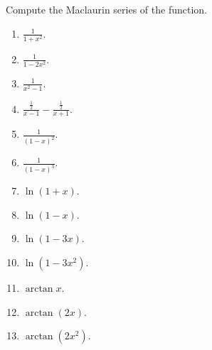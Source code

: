 Compute the Maclaurin series of the function.
\begin{multicols}{2}
\begin{enumerate}
\item $\frac{1}{1+x^2}$.
\item $\frac{1}{1-2x^2}$.
\item $\frac{1}{x^2-1}$.
\item $\frac{\frac12}{x-1}-\frac{\frac12}{x+1}$.
\item $ \frac{1}{(1-x)^2}$.
\item $ \frac{1}{(1-x)^3}$.
\item $\ln (1+x)$.
\item $\ln (1-x)$.
\item $\ln (1-3x)$.
\item $\ln (1-3x^2)$.
\item $\arctan x$.
\item $\arctan (2x)$.
\item $\arctan \left(2x^2\right)$.

\end{enumerate}
\end{multicols}
